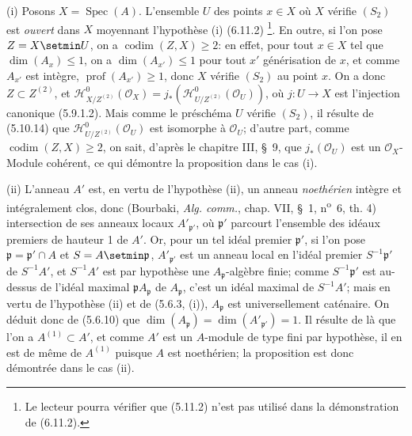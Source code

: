(i) Posons $X=\operatorname{Spec}(A)$. L'ensemble $U$ des points $x\in X$ où
$X$ vérifie $(S_2)$ est \emph{ouvert} dans $X$ moyennant l'hypothèse (i) (6.11.2)
\footnote{Le lecteur pourra vérifier que (5.11.2) n'est pas utilisé dans la
démonstration de (6.11.2).}. En outre, si l'on pose $Z=X\setmin U$, on a
$\operatorname{codim}(Z,X)\geq2$: en effet, pour tout $x\in X$ tel que
$\dim(A_x)\leq1$, on a $\dim(A_{x'})\leq1$ pour tout $x'$ générisation de
$x$, et comme $A_{x'}$ est intègre, $\operatorname{prof}(A_{x'})\geq1$, donc
$X$ vérifie $(S_2)$ au point $x$. On a donc $Z\subset Z^{(2)}$, et
$\mathcal H^0_{X/Z^{(2)}}(\mathcal O_X)
=j_*(\mathcal H^0_{U/Z^{(2)}}(\mathcal O_U))$, où $j:U\to X$ est l'injection
canonique (5.9.1.2). Mais comme le préschéma $U$ vérifie $(S_2)$, il résulte de
(5.10.14) que $\mathcal H^0_{U/Z^{(2)}}(\mathcal O_U)$ est isomorphe à
$\mathcal O_U$; d'autre part, comme $\operatorname{codim}(Z,X)\geq2$, on sait,
d'après le chapitre III, \S~9, que $j_*(\mathcal O_U)$ est un
$\mathcal O_X$-Module cohérent, ce qui démontre la proposition dans le cas
(i).

(ii) L'anneau $A'$ est, en vertu de l'hypothèse (ii), un anneau \emph{noethérien}
intègre et intégralement clos, donc (Bourbaki, \emph{Alg. comm.}, chap. VII,
\S~1, n\textsuperscript{o}~6, th. 4) intersection de ses anneaux locaux
$A'_{\mathfrak p'}$, où $\mathfrak p'$ parcourt l'ensemble des idéaux premiers
de hauteur 1 de $A'$. Or, pour un tel idéal premier $\mathfrak p'$, si l'on
pose $\mathfrak p=\mathfrak p'\cap A$ et $S=A\setmin\mathfrak p$,
$A'_{\mathfrak p'}$ est un anneau local en l'idéal premier
$S^{-1}\mathfrak p'$ de $S^{-1}A'$, et $S^{-1}A'$ est par hypothèse
une $A_\mathfrak p$-algèbre finie; comme $S^{-1}\mathfrak p'$ est au-dessus
de l'idéal maximal $\mathfrak pA_\mathfrak p$ de $A_\mathfrak p$, c'est un
idéal maximal de $S^{-1}A'$; mais en vertu de l'hypothèse (ii) et de (5.6.3,
(i)), $A_\mathfrak p$ est universellement caténaire. On déduit donc de
(5.6.10) que
$\dim(A_\mathfrak p)=\dim(A'_{\mathfrak p'})=1$. Il résulte de là que l'on a
$A^{(1)}\subset A'$, et comme $A'$ est un $A$-module de type fini par
hypothèse, il en est de même de $A^{(1)}$ puisque $A$ est noethérien; la
proposition est donc démontrée dans le cas (ii).

